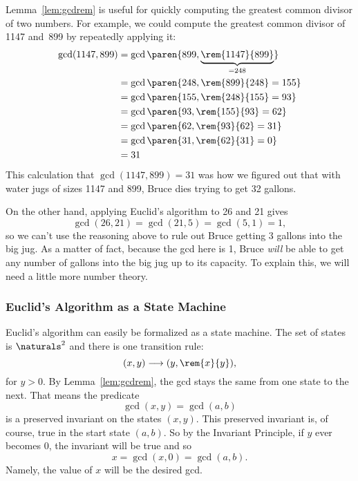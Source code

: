 Lemma~\ref{lem:gcdrem} is useful for quickly computing the greatest
common divisor of two numbers.  For example, we could compute the
greatest common divisor of 1147 and~899 by repeatedly applying it:
\begin{align*}
\gcd(1147, 899) &= \gcd\paren{899, \underbrace{\rem{1147}{899}}_{{} = 248}} \\
&= \gcd\paren{248, \rem{899}{248} = 155} \\
&= \gcd\paren{155, \rem{248}{155} = 93} \\
&= \gcd\paren{ 93, \rem{155}{93} = 62}\\
&= \gcd\paren{ 62, \rem{93}{62} = 31} \\
&= \gcd\paren{ 31, \rem{62}{31} = 0} \\
&= 31
\end{align*}
This calculation that $\gcd(1147, 899) = 31$ was how we figured out
that with water jugs of sizes 1147 and 899, Bruce dies trying to get
32 gallons.

On the other hand, applying Euclid's algorithm to 26 and 21 gives
\[
\gcd(26, 21) = \gcd(21, 5) = \gcd(5, 1) = 1,
\]
so we can't use the reasoning above to rule out Bruce getting 3
gallons into the big jug.  As a matter of fact, because the gcd here
is 1, Bruce \emph{will} be able to get any number of gallons into the big jug
up to its capacity.  To explain this, we will need a little more
number theory.

\subsubsection{Euclid's Algorithm as a State Machine}
Euclid's algorithm can easily be formalized as a state
machine.  The set of states is $\naturals^2$ and there is one
transition rule:
\begin{equation}\label{euclid_transition}
(x,y) \movesto (y, \rem{x}{y}),
\end{equation}
for $y>0$.  By Lemma~\ref{lem:gcdrem}, the gcd stays the same from one
state to the next.  That means the predicate
\[
\gcd(x,y) = \gcd(a,b)
\]
is a preserved invariant on the states $(x,y)$.  This preserved
invariant is, of course, true in the start state $(a,b)$.  So by the
Invariant Principle, if $y$ ever becomes $0$, the invariant will be
true and so
\[
x = \gcd(x,0) = \gcd(a,b).
\]
Namely, the value of $x$ will be the desired gcd.

